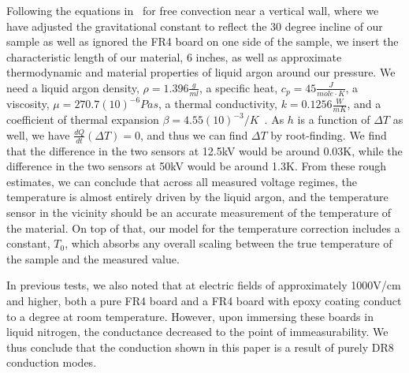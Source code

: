 \documentclass[a4paper,12pt]{article}
\newcommand{\RI}[1]{\textcolor{blue}{#1}}
\begin{document}
Following the equations in~\cite{CHURCHILL19751323} for free convection near a vertical wall, where we have adjusted the gravitational constant to reflect the 30 degree incline of our sample as well as ignored the FR4 board on one side of the sample, we insert the characteristic length of our material, 6 inches, as well as approximate thermodynamic and material properties of liquid argon around our pressure. We need a liquid argon density, $\rho=1.396\frac{g}{ml}$, a specific heat, $c_p=45\frac{J}{mole \cdot K}$, a viscosity, $\mu=270.7(10)^{-6}Pa s$, a thermal conductivity, $k=0.1256\frac{W}{m K}$, and a coefficient of thermal expansion $\beta=4.55(10)^{ -3}/K$~\cite{GLADUN1971205}\cite{STREETT197459}\cite{lbnl}. As $h$ is a function of $\Delta T$ as well, we have $\frac{dQ}{dt}(\Delta T)=0$, and thus we can find $\Delta T$ by root-finding. We find that the difference in the two sensors at 12.5kV would be around 0.03K, while the difference in the two sensors at 50kV would be around 1.3K. From these rough estimates, we can conclude that across all measured voltage regimes, the temperature is almost entirely driven by the liquid argon, and the temperature sensor in the vicinity should be an accurate measurement of the temperature of the material. On top of that, our model for the temperature correction includes a constant, $T_0$, which absorbs any overall scaling between the true temperature of the sample and the measured value.

In previous tests, we also noted that at electric fields of approximately 1000V/cm and higher, both a pure FR4 board and a FR4 board with epoxy coating conduct to a degree at room temperature. However, upon immersing these boards in liquid nitrogen, the conductance decreased to the point of immeasurability. We thus conclude that the conduction shown in this paper is a result of purely DR8 conduction modes.



\end{document}
